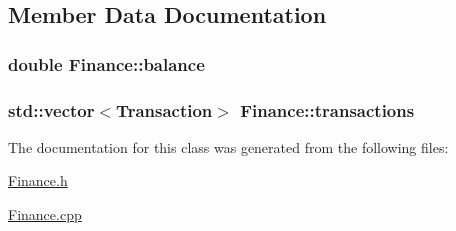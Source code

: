 \subsection{Member Data Documentation}
\subsubsection[{\texorpdfstring{balance}{balance}}]{\setlength{\rightskip}{0pt plus 5cm}double Finance\+::balance\hspace{0.3cm}{\ttfamily [private]}}\hypertarget{classFinance_ac239c4085777ca86ba45c4c8d6723926}{}\label{classFinance_ac239c4085777ca86ba45c4c8d6723926}
\subsubsection[{\texorpdfstring{transactions}{transactions}}]{\setlength{\rightskip}{0pt plus 5cm}std\+::vector$<${\bf Transaction}$>$ Finance\+::transactions\hspace{0.3cm}{\ttfamily [private]}}\hypertarget{classFinance_a09c32851f7aa143176bbd995e096f34e}{}\label{classFinance_a09c32851f7aa143176bbd995e096f34e}


The documentation for this class was generated from the following files\+:\begin{DoxyCompactItemize}
\item 
\hyperlink{Finance_8h}{Finance.\+h}\item 
\hyperlink{Finance_8cpp}{Finance.\+cpp}\end{DoxyCompactItemize}
